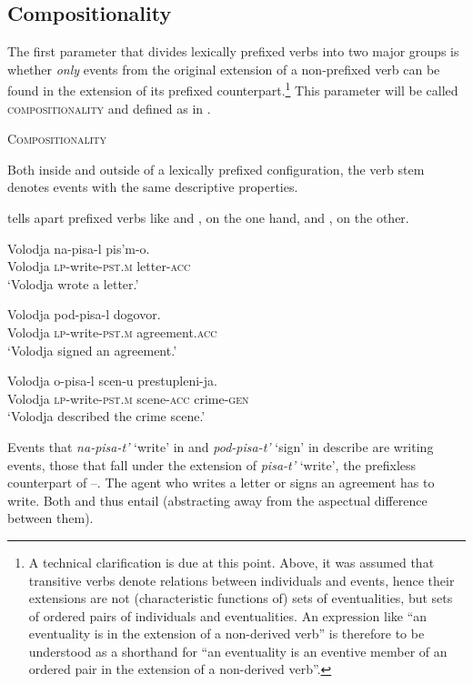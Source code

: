\documentclass[output=paper,colorlinks,citecolor=brown]{langscibook}
\begin{document}
\subsection{Compositionality}\label{tat:sec:3.2}
\hypertarget{RefHeadingToc164647626}{}
The first parameter that divides lexically prefixed verbs into two major groups is whether \textit{only} events from the original extension of a non-prefixed verb can be found in the extension of its prefixed counterpart.\footnote{A technical clarification is due at this point. Above, it was assumed that transitive verbs denote relations between individuals and events, hence their extensions are not (characteristic functions of) sets of eventualities, but sets of ordered pairs of individuals and eventualities. An expression like “an eventuality is in the extension of a non-derived verb” is therefore to be understood as a shorthand for “an eventuality is an eventive member of an ordered pair in the extension of a non-derived verb”.}  This parameter will be called \textsc{compositionality} and defined as in .

\eanoraggedright   \textsc{Compositionality}\label{ex:tatevosov:66}

Both inside and outside of a lexically prefixed configuration, the verb stem denotes events with the same descriptive properties. 
\z

\noindent {} tells apart prefixed verbs like  and , on the one hand, and , on the other.

\ea\label{ex:tatevosov:67}
\gll Volodja na-pisa-l pis’m-o.\\
  Volodja  \textsc{lp}-write-\textsc{pst.m} letter-\textsc{acc}\\
\glt ‘Volodja wrote a letter.’
\z

\ea\label{ex:tatevosov:68}
\gll Volodja pod-pisa-l dogovor.  \\
  Volodja  \textsc{lp}-write-\textsc{pst.m}  agreement.\textsc{acc}\\
\glt ‘Volodja signed an agreement.’
\z

\ea\label{tat:ex:69}
\gll Volodja o-pisa-l scen-u  prestupleni-ja.\\
  Volodja  \textsc{lp}-write-\textsc{pst.m}  scene-\textsc{acc}  crime-\textsc{gen}\\
\glt ‘Volodja described the crime scene.’
\z

\noindent Events that \textit{na-pisa-t’} ‘write’ in  and \textit{pod-pisa-t’} ‘sign’ in  describe are writing events, those that fall under the extension of \textit{pisa-t’} ‘write’, the prefixless counterpart of --. The agent who writes a letter or signs an agreement has to write. Both  and  thus entail  (abstracting away from the aspectual difference between them).
\end{document}
